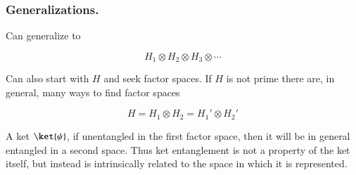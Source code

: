 \subsubsection{Generalizations.}

Can generalize to 

\begin{equation}\label{eqn:qmTwoL1:370}
H_1 \otimes H_2 \otimes H_3 \otimes \cdots
\end{equation}

Can also start with $H$ and seek factor spaces.  If $H$ is not prime there are, in general, many ways to find factor spaces

\begin{equation}\label{eqn:qmTwoL1:390}
H = 
H_1 \otimes H_2 =
H_1' \otimes H_2'
\end{equation}

A ket $\ket{\psi}$, if unentangled in the first factor space, then it will be in general entangled in a second space.  Thus ket entanglement is not a property of the ket itself, but instead is intrinsically related to the space in which it is represented.

\EndArticle
